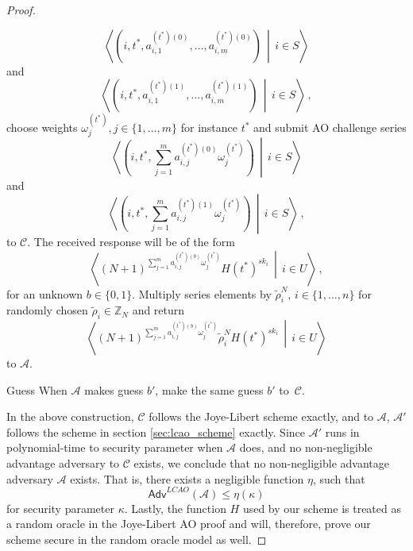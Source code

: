 \documentclass[10pt,letterpaper,oneside,twocolumn,journal]{IEEEtran}
\theoremstyle{definition}
\theoremstyle{definition}
\theoremstyle{remark}
\begin{document}
\begin{proof}
\begin{LaTeXdescription}
\begin{equation*}
            \left\langle\left(i,t^*,a^{(t^*)(0)}_{i,1},\dots,a^{(t^*)(0)}_{i,m}\right)\,\middle|\,i \in S\right\rangle
        \end{equation*}
        and
        \begin{equation*}
            \left\langle\left(i,t^*,a^{(t^*)(1)}_{i,1},\dots,a^{(t^*)(1)}_{i,m}\right)\,\middle|\, i \in S\right\rangle\,,
        \end{equation*}
        choose weights $\omega^{(t^*)}_j,j\in\{1,\dots,m\}$ for instance $t^*$ and submit AO challenge series
        \begin{equation*}
            \left\langle\left(i,t^*,\sum^m_{j=1}a^{(t^*)(0)}_{i,j}\omega^{(t^*)}_j\right)\,\middle|\,i \in S\right\rangle
        \end{equation*}
        and
        \begin{equation*}
            \left\langle\left(i,t^*,\sum^m_{j=1}a^{(t^*)(1)}_{i,j}\omega^{(t^*)}_j\right)\,\middle|\,i \in S\right\rangle\,,
        \end{equation*}
        to $\mathcal{C}$. The received response will be of the form 
        \begin{equation*}
            \left\langle(N+1)^{\sum^m_{j=1}a^{(t^*)(b)}_{i,j}\omega^{(t^*)}_j}H(t^*)^{sk_i}\,\middle|\,i\in U\right\rangle\,,
        \end{equation*}
        for an unknown $b \in \{0,1\}$. Multiply series elements by $\tilde{\rho}_i^N,\,i\in\{1,\dots,n\}$ for randomly chosen $\tilde{\rho}_i \in \mathbb{Z}_N$ and return
        \begin{equation*}
            \left\langle(N+1)^{\sum^m_{j=1}a^{(t^*)(b)}_{i,j}\omega^{(t^*)}_j}\tilde{\rho}_i^N H(t^*)^{sk_i}\,\middle|\,i\in U\right\rangle
        \end{equation*}
        to $\mathcal{A}$.
        \item[Guess] When $\mathcal{A}$ makes guess $b'$, make the same guess $b'$ to~$\mathcal{C}$.
    \end{LaTeXdescription}

    In the above construction, $\mathcal{C}$ follows the Joye-Libert scheme exactly, and to $\mathcal{A}$, $\mathcal{A}'$ follows the scheme in section \ref{sec:lcao_scheme} exactly. Since $\mathcal{A}'$ runs in polynomial-time to security parameter when $\mathcal{A}$ does, and no non-negligible advantage adversary to $\mathcal{C}$ exists, we conclude that no non-negligible advantage adversary $\mathcal{A}$ exists. That is, there exists a negligible function $\eta$, such that
    \begin{equation*}
        \mathsf{Adv}^{LCAO}(\mathcal{A}) \leq \eta(\kappa)
    \end{equation*}
    for security parameter $\kappa$. Lastly, the function $H$ used by our scheme is treated as a random oracle in the Joye-Libert AO proof and will, therefore, prove our scheme secure in the random oracle model as well.
\end{proof}
\end{document}
